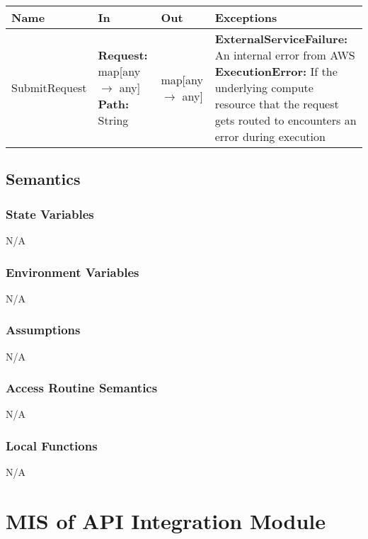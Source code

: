 \documentclass[12pt, titlepage]{article}
\begin{document}
\begin{center}
  \begin{tabular}{>{\raggedright}p{3cm} >{\raggedright}p{5cm}
    >{\raggedright}p{4cm} p{4cm}}
    \hline
    \textbf{Name} & \textbf{In} & \textbf{Out} & \textbf{Exceptions} \\
    \hline
    SubmitRequest & \textbf{Request:} map[any $\rightarrow$ any]
    \newline \textbf{Path:} String & map[any $\rightarrow$ any] &
    \textbf{ExternalServiceFailure:} An internal error from
    AWS \newline \textbf{ExecutionError:} If the underlying compute
    resource that the request gets routed to encounters an error
    during execution \\
    \hline
  \end{tabular}
\end{center}

\subsection{Semantics}

\subsubsection{State Variables}

N/A

\subsubsection{Environment Variables}

N/A

\subsubsection{Assumptions}

N/A

\subsubsection{Access Routine Semantics}

N/A

\subsubsection{Local Functions}

N/A

\section{MIS of API Integration Module} \label{Module}
\end{document}
